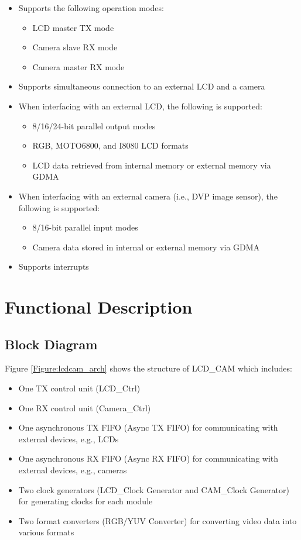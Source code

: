 \documentclass[main\_\_EN.tex]{subfiles}
\begin{document}
\begin{itemize}
    \item Supports the following operation modes:
    \begin{itemize}
        \item LCD master TX mode
        \item Camera slave RX mode
        \item Camera master RX mode
    \end{itemize}
    \item Supports simultaneous connection to an external LCD and a camera
    \item When interfacing with an external LCD, the following is supported:
    \begin{itemize}
        \item 8/16/24-bit parallel output modes
        \item RGB, MOTO6800, and I8080 LCD formats
        \item LCD data retrieved from internal memory or external memory via GDMA
    \end{itemize}
    \item When interfacing with an external camera (i.e., DVP image sensor), the following is supported:
    \begin{itemize}
        \item 8/16-bit parallel input modes
        \item Camera data stored in internal or external memory via GDMA
    \end{itemize}
    \item Supports interrupts
\end{itemize}

\section{Functional Description}

\subsection{Block Diagram}

Figure \ref{Figure:lcdcam_arch} shows the structure of LCD\_CAM which includes:

\begin{itemize}
    \item One TX control unit (LCD\_Ctrl)
    \item One RX control unit (Camera\_Ctrl)
    \item One asynchronous TX FIFO (Async TX FIFO) for communicating with external devices, e.g., LCDs
    \item One asynchronous RX FIFO (Async RX FIFO) for communicating with external devices, e.g., cameras
    \item Two clock generators (LCD\_Clock Generator and CAM\_Clock Generator) for generating clocks for each module
    \item Two format converters (RGB/YUV Converter) for converting video data into various formats
\end{itemize}
\end{document}
